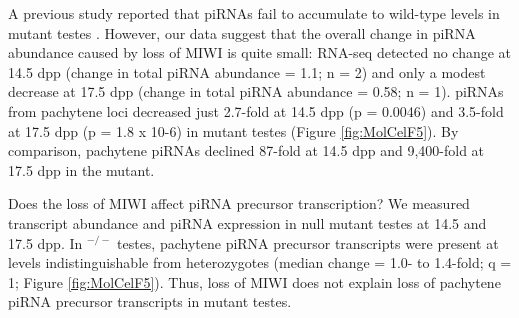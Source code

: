     A previous study reported that piRNAs fail to accumulate to wild-type levels in \miwi{} mutant testes \citep{Grivna2006}. However, our data suggest that the overall change in piRNA abundance caused by loss of MIWI is quite small: RNA-seq detected no change at 14.5 dpp (change in total piRNA abundance = 1.1; n = 2) and only a modest decrease at 17.5 dpp (change in total piRNA abundance = 0.58; n = 1). piRNAs from pachytene loci decreased just 2.7-fold at 14.5 dpp (p = 0.0046) and 3.5-fold at 17.5 dpp (p = 1.8 x 10-6) in \miwi{} mutant testes (Figure \ref{fig:MolCelF5}). By comparison, pachytene piRNAs declined 87-fold at 14.5 dpp and 9,400-fold at 17.5 dpp in the \amyb{} mutant.

    Does the loss of MIWI affect piRNA precursor transcription? We measured transcript abundance and piRNA expression in \miwi{} null mutant testes at 14.5 and 17.5 dpp. In \miwi{}$^{-/-}$ testes, pachytene piRNA precursor transcripts were present at levels indistinguishable from \miwi{} heterozygotes (median change = 1.0- to 1.4-fold; q = 1; Figure \ref{fig:MolCelF5}). Thus, loss of MIWI does not explain loss of pachytene piRNA precursor transcripts in \amyb{} mutant testes.

